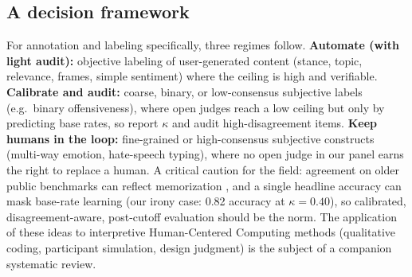 \subsection{A decision framework}
For annotation and labeling specifically, three regimes follow. \textbf{Automate (with light audit):} objective
labeling of user-generated content (stance, topic, relevance, frames, simple sentiment) where the ceiling is high
and verifiable. \textbf{Calibrate and audit:} coarse, binary, or low-consensus subjective labels (e.g.\ binary
offensiveness), where open judges reach a low ceiling but only by predicting base rates, so report $\kappa$ and audit
high-disagreement items. \textbf{Keep humans in the loop:} fine-grained or high-consensus subjective constructs
(multi-way emotion, hate-speech typing), where no open judge in our panel earns the right to replace a human. A
critical caution for the field: agreement on older public benchmarks can reflect memorization
\citep{bender2021parrots}, and a single headline accuracy can mask base-rate learning (our irony case: 0.82 accuracy
at $\kappa{=}0.40$), so calibrated, disagreement-aware, post-cutoff evaluation should be the norm. The application of
these ideas to interpretive Human-Centered Computing methods (qualitative coding, participant simulation, design
judgment) is the subject of a companion systematic review.

